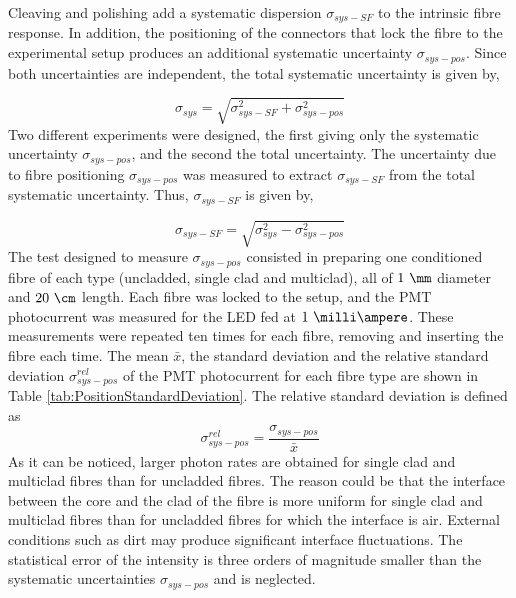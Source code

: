 Cleaving and polishing add a systematic dispersion $\sigma_{sys-SF}$ to the intrinsic fibre response. In addition, the positioning of the connectors that lock the fibre to the experimental setup produces an additional systematic uncertainty $\sigma_{sys-pos}$. Since both uncertainties are independent, the total systematic uncertainty is given by,

\begin{equation}
\sigma_{sys} = \sqrt{\sigma^2_{sys-SF} + \sigma^2_{sys-pos} }
\label{eq:TotalUncertaintyFiberCharacterization}
\end{equation}
Two different experiments were designed, the first giving only the systematic uncertainty $\sigma_{sys-pos}$, and the second the total uncertainty. The uncertainty due to fibre positioning $\sigma_{sys-pos}$ was measured to extract $\sigma_{sys-SF}$ from the total systematic uncertainty. Thus, $\sigma_{sys-SF}$ is given by,

\begin{equation}
\sigma_{sys-SF} = \sqrt{\sigma^2_{sys} - \sigma^2_{sys-pos} }
\label{eq:TMUncertaintyFiberCharacterization}
\end{equation}
The test designed to measure $\sigma_{sys-pos}$ consisted in preparing one conditioned fibre of each type (uncladded, single clad and multiclad), all of $1~\mm$ diameter and $20~\cm$ length. Each fibre was locked to the setup, and the PMT photocurrent was measured for the LED fed at $1~\milli\ampere$. These measurements were repeated ten times for each fibre, removing and inserting the fibre each time. The mean $\bar{x}$, the standard deviation  and the relative standard deviation $\sigma^{rel}_{sys-pos}$
of the PMT photocurrent for each fibre type are shown in Table \ref{tab:PositionStandardDeviation}. The relative standard deviation is defined as
\begin{equation}
\sigma^{rel}_{sys-pos} = \frac{\sigma_{sys-pos}}{\bar{x}}
\label{eq:RelativeStandardDesviation}
\end{equation}
As it can be noticed, larger photon rates are obtained for single clad and multiclad fibres than for uncladded fibres. The reason could be that the interface between the core and the clad of the fibre is more uniform for single clad and multiclad fibres than for uncladded fibres for which the interface is air. External conditions such as dirt may produce significant interface fluctuations. The statistical error of the intensity is three orders of magnitude smaller than the systematic uncertainties $\sigma_{sys-pos}$ and is neglected.

